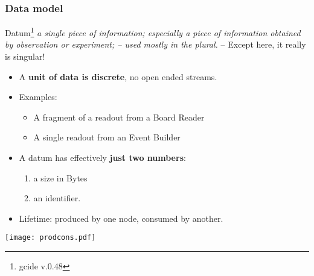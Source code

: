 \documentclass[xcolor=dvipsnames]{beamer}
\begin{document}
\begin{frame}
  \frametitle{Data model} 

  Datum\footnote{gcide v.0.48} \textit{a single piece of information; especially a
    piece of information obtained by observation or experiment; --
    used mostly in the plural.} -- Except here, it really is singular!

  \begin{itemize}
  \item A \textbf{unit of data is discrete}, no open ended streams.
  \item Examples:
    \begin{itemize}
    \item A fragment of a readout from a Board Reader
    \item A single readout from an Event Builder
    \end{itemize}
  \item A datum has effectively \textbf{just two numbers}:
    \begin{enumerate}
    \item a size in Bytes
    \item an identifier.
    \end{enumerate}
  \item Lifetime: produced by one node, consumed by another.
  \end{itemize}
  \vspace{-10mm}
  \begin{center}
    \texttt{[image: prodcons.pdf]}
  \end{center}
  \vspace{-10mm}
\end{frame}
\end{document}
